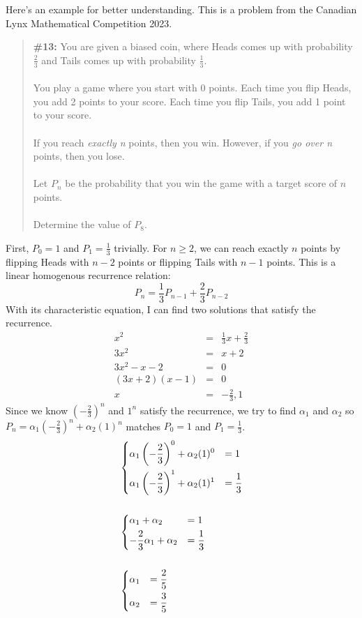 \documentclass[12pt, oneside]{article}
\begin{document}
Here's an example for better understanding. This is a problem from the Canadian Lynx Mathematical Competition 2023.
\begin{quote}
\textbf{\#13:} You are given a biased coin, where Heads comes up with probability $\frac{2}{3}$ and Tails comes up with probability $\frac{1}{3}$.\\\\You play a game where you start with 0 points. Each time you flip Heads, you add 2 points to your score. Each time you flip Tails, you add 1 point to your score.\\\\If you reach \emph{exactly n} points, then you win. However, if you \emph{go over n} points, then you lose.\\\\Let $P_n$ be the probability that you win the game with a target score of $n$ points.\\\\Determine the value of $P_8$.
\end{quote}
First, $P_0 = 1$ and $P_1 = \frac{1}{3}$ trivially. For $n \geq 2$, we can reach exactly $n$ points by flipping Heads with $n-2$ points or flipping Tails with $n-1$ points. This is a linear homogenous recurrence relation:\[P_n = \frac{1}{3}P_{n-1} + \frac{2}{3}P_{n-2}\] With its characteristic equation, I can find two solutions that satisfy the recurrence.
\begin{eqnarray*}
x^2 & = & \frac{1}{3}x + \frac{2}{3}\\
3x^2 & = & x + 2\\
3x^2 - x - 2 & = & 0\\
(3x+2)(x-1) & = & 0\\
x & = & -\frac{2}{3}, 1
\end{eqnarray*}
Since we know $(-\frac{2}{3})^n$ and $1^n$ satisfy the recurrence, we try to find $\alpha_1$ and $\alpha_2$ so $P_n = \alpha_1(-\frac{2}{3})^n + \alpha_2(1)^n$ matches $P_0 = 1$ and $P_1 = \frac{1}{3}$. 
\begin{align*}
&\begin{dcases}
\alpha_1\left(-\frac{2}{3}\right)^0 + \alpha_2(1)^0 & = 1\\
\alpha_1\left(-\frac{2}{3}\right)^1 + \alpha_2(1)^1 & = \frac{1}{3}\\
\end{dcases}\\\\
&\begin{dcases}
\alpha_1 + \alpha_2 & = 1\\
-\frac{2}{3}\alpha_1 + \alpha_2 & = \frac{1}{3}\\
\end{dcases}\\\\
&\begin{dcases}
\alpha_1 & = \frac{2}{5}\\
\alpha_2 & = \frac{3}{5}
\end{dcases}
\end{align*}
\end{document}

